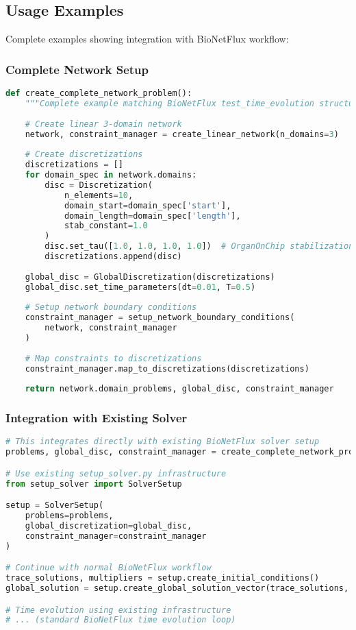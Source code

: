 \subsection{Usage Examples}
\label{subsec:usage_examples}

Complete examples showing integration with BioNetFlux workflow:

\subsubsection{Complete Network Setup}

\begin{lstlisting}[language=Python, caption=Complete Network Problem Setup]
def create_complete_network_problem():
    """Complete example matching BioNetFlux test_time_evolution structure."""
    
    # Create linear 3-domain network
    network, constraint_manager = create_linear_network(n_domains=3)
    
    # Create discretizations
    discretizations = []
    for domain_spec in network.domains:
        disc = Discretization(
            n_elements=10,
            domain_start=domain_spec['start'], 
            domain_length=domain_spec['length'],
            stab_constant=1.0
        )
        disc.set_tau([1.0, 1.0, 1.0, 1.0])  # OrganOnChip stabilization
        discretizations.append(disc)
    
    global_disc = GlobalDiscretization(discretizations)
    global_disc.set_time_parameters(dt=0.01, T=0.5)
    
    # Setup network boundary conditions
    constraint_manager = setup_network_boundary_conditions(
        network, constraint_manager
    )
    
    # Map constraints to discretizations
    constraint_manager.map_to_discretizations(discretizations)
    
    return network.domain_problems, global_disc, constraint_manager
\end{lstlisting}

\subsubsection{Integration with Existing Solver}

\begin{lstlisting}[language=Python, caption=Solver Integration]
# This integrates directly with existing BioNetFlux solver setup
problems, global_disc, constraint_manager = create_complete_network_problem()

# Use existing setup_solver.py infrastructure
from setup_solver import SolverSetup

setup = SolverSetup(
    problems=problems,
    global_discretization=global_disc, 
    constraint_manager=constraint_manager
)

# Continue with normal BioNetFlux workflow
trace_solutions, multipliers = setup.create_initial_conditions()
global_solution = setup.create_global_solution_vector(trace_solutions, multipliers)

# Time evolution using existing infrastructure
# ... (standard BioNetFlux time evolution loop)
\end{lstlisting}


